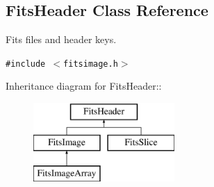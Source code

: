 \subsection{Fits\-Header  Class Reference}
\label{class_fitsheader}
Fits files and header keys. 


{\tt \#include $<$fitsimage.h$>$}

Inheritance diagram for Fits\-Header::\begin{figure}[H]
\begin{center}
\leavevmode
\includegraphics[height=3cm]{class_fitsheader}
\end{center}
\end{figure}
